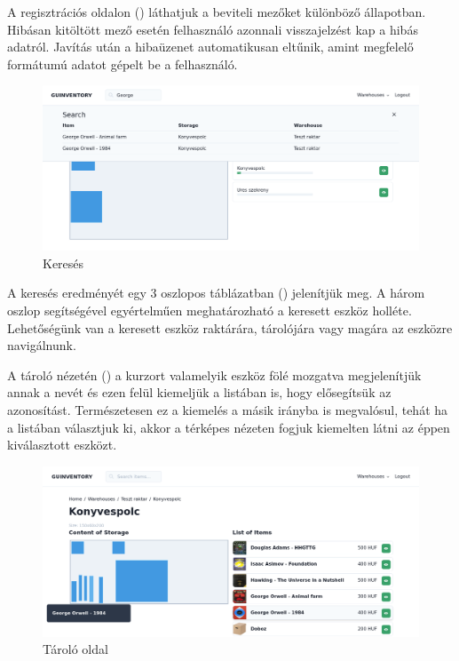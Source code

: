 A regisztrációs oldalon () láthatjuk a beviteli mezőket különböző állapotban.
Hibásan kitöltött mező esetén felhasználó azonnali visszajelzést kap a hibás adatról.
Javítás után a hibaüzenet automatikusan eltűnik, amint megfelelő formátumú adatot gépelt be a felhasználó.

\begin{figure}[!ht]
  \centering
  \includegraphics[width=150mm, keepaspectratio]{figures/search.png}
  \caption{Keresés}
  \label{fig:search}
\end{figure}

A keresés eredményét egy 3 oszlopos táblázatban () jelenítjük meg.
A három oszlop segítségével egyértelműen meghatározható a keresett eszköz holléte.
Lehetőségünk van a keresett eszköz raktárára, tárolójára vagy magára az eszközre navigálnunk.

A tároló nézetén () a kurzort valamelyik eszköz fölé mozgatva megjelenítjük annak a nevét és ezen felül kiemeljük a listában is, hogy elősegítsük az azonosítást.
Természetesen ez a kiemelés a másik irányba is megvalósul, tehát ha a listában választjuk ki, akkor a térképes nézeten fogjuk kiemelten látni az éppen kiválasztott eszközt.

\begin{figure}[!ht]
  \centering
  \includegraphics[width=150mm, keepaspectratio]{figures/storage.png}
  \caption{Tároló oldal}
  \label{fig:storage}
\end{figure}

